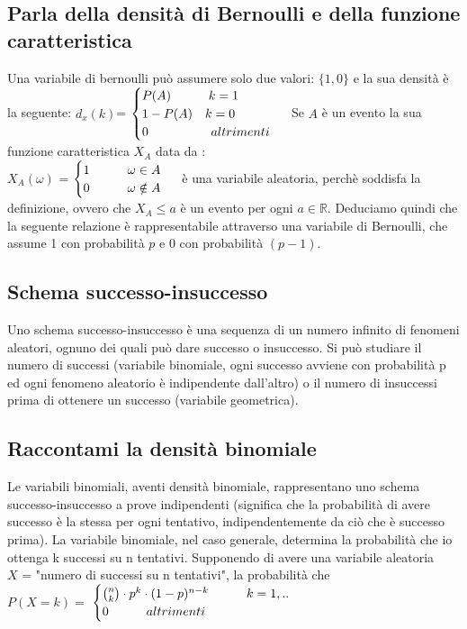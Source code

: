 \documentclass[a4paper,12pt]{report}
\begin{document}
	\subsection{Parla della densità di Bernoulli e della funzione caratteristica}
	Una variabile di bernoulli può assumere solo due valori: $\{1, 0\}$ e la sua densità è la seguente: $d_x(k)$=
	$
	\begin{cases}
		P(A)\qquad\quad  	k = 1 \\  
		1 - P(A)\quad	k = 0 \\
		0\qquad\qquad\quad		altrimenti
	\end{cases} \\
	$ 
	Se $A$ è un evento la sua funzione caratteristica $X_A$ data da :\\$X_A(\omega)$ =
	$
	\begin{cases}
		1\qquad\quad  	\omega \in A \\  
		0\qquad\quad	\omega \notin A \\
	\end{cases} \\
	$ 
	è una variabile aleatoria, perchè soddisfa la definizione, ovvero che $X_A \leq a$ è un evento per ogni $a \in \mathbb{R}$.
	Deduciamo quindi che la seguente relazione è rappresentabile attraverso una variabile di Bernoulli, che assume 1 con probabilità $p$ e 0 con probabilità $(p - 1)$.
	\subsection{Schema successo-insuccesso}
	Uno schema successo-insuccesso è una sequenza di un numero infinito di fenomeni aleatori,
	ognuno dei quali può dare successo o insuccesso. Si può studiare il numero di successi
	(variabile binomiale, ogni successo avviene con probabilità p ed ogni fenomeno aleatorio è
	indipendente dall'altro) o il numero di insuccessi prima di ottenere un successo (variabile
	geometrica).
	\subsection{Raccontami la densità binomiale}
	Le variabili binomiali, aventi densità binomiale, rappresentano uno schema successo-insuccesso a prove indipendenti (significa che la probabilità di avere successo è la stessa per ogni tentativo, indipendentemente da ciò che è successo prima).
	La variabile binomiale, nel caso generale, determina la probabilità che io ottenga k successi su n tentativi. Supponendo di avere una variabile aleatoria \\ $X$ = "numero di successi su n tentativi", la probabilità che \\$P(X = k) = $ 
	$
	\begin{cases}
		\binom{n}{k} \cdot p^k \cdot (1-p)^{n-k}\qquad\quad k = 1, .. \\  
		0\qquad\quad	altrimenti \\
	\end{cases} \\
	$
\end{document}
